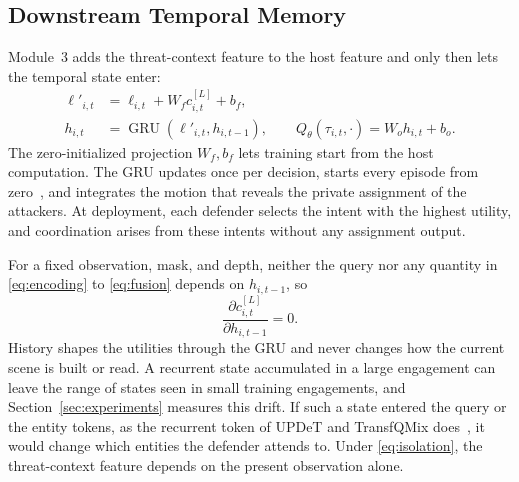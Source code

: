 \subsection{Downstream Temporal Memory}
\label{subsec:method-memory}
Module~3 adds the threat-context feature to the host feature and only then lets the temporal state enter:
\begin{align}
\ell'_{i,t}&=\ell_{i,t}+W_fc^{[L]}_{i,t}+b_f,\nonumber\\
h_{i,t}&=\operatorname{GRU}(\ell'_{i,t},h_{i,t-1}),\qquad
Q_\theta(\tau_{i,t},\cdot)=W_oh_{i,t}+b_o.
\label{eq:decision}
\end{align}
The zero-initialized projection $W_f,b_f$ lets training start from the host computation. The GRU updates once per decision, starts every episode from zero~\cite{hausknecht2015drqn}, and integrates the motion that reveals the private assignment of the attackers. At deployment, each defender selects the intent with the highest utility, and coordination arises from these intents without any assignment output.

For a fixed observation, mask, and depth, neither the query nor any quantity in \eqref{eq:encoding} to \eqref{eq:fusion} depends on $h_{i,t-1}$, so
\begin{equation}
\frac{\partial c^{[L]}_{i,t}}{\partial h_{i,t-1}}=0.
\label{eq:isolation}
\end{equation}
History shapes the utilities through the GRU and never changes how the current scene is built or read. A recurrent state accumulated in a large engagement can leave the range of states seen in small training engagements, and Section~\ref{sec:experiments} measures this drift. If such a state entered the query or the entity tokens, as the recurrent token of UPDeT and TransfQMix does~\cite{hu2021updet,transfqmix2023}, it would change which entities the defender attends to. Under \eqref{eq:isolation}, the threat-context feature depends on the present observation alone.

